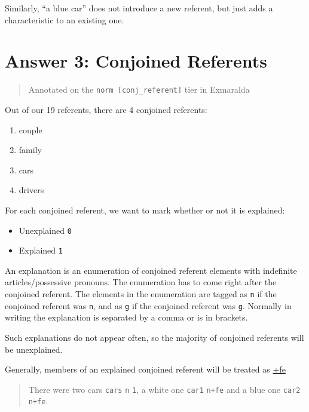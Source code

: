 \documentclass[
]{book}
\providecommand{\tightlist}{%
  \setlength{\itemsep}{0pt}\setlength{\parskip}{0pt}}
\begin{document}
Similarly, ``a blue car'' does not introduce a new referent, but just adds a characteristic to an existing one.

\hypertarget{answer-3-conjoined-referents}{%
\chapter{Answer 3: Conjoined Referents}\label{answer-3-conjoined-referents}}

\begin{quote}
Annotated on the \texttt{norm\ {[}conj\_referent{]}} tier in Exmaralda
\end{quote}

Out of our 19 referents, there are 4 conjoined referents:

\begin{enumerate}
\def\labelenumi{\arabic{enumi}.}
\tightlist
\item
  couple
\item
  family
\item
  cars
\item
  drivers
\end{enumerate}

For each conjoined referent, we want to mark whether or not it is explained:

\begin{itemize}
\tightlist
\item
  Unexplained \texttt{0}
\item
  Explained \texttt{1}
\end{itemize}

An explanation is an enumeration of conjoined referent elements with indefinite articles/possessive pronouns.
The enumeration has to come right after the conjoined referent.
The elements in the enumeration are tagged as \texttt{n} if the conjoined referent was \texttt{n}, and as \texttt{g} if the conjoined referent was \texttt{g}.
Normally in writing the explanation is separated by a comma or is in brackets.

Such explanations do not appear often, so the majority of conjoined referents will be unexplained.

Generally, members of an explained conjoined referent will be treated as \protect\hyperlink{further-explanation}{+fe}

\begin{quote}
There were two cars \texttt{cars} \texttt{n} \texttt{1}, a white one \texttt{car1} \texttt{n+fe} and a blue one \texttt{car2} \texttt{n+fe}.
\end{quote}
\end{document}
